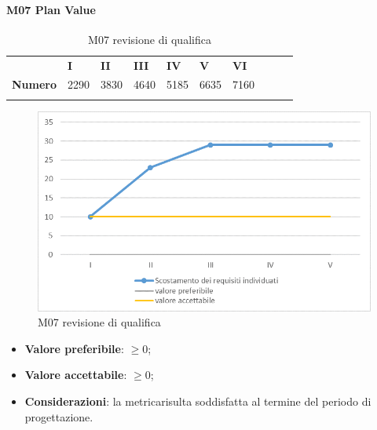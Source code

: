 \paragraph{M07 Plan Value} \mbox{}
\begin{longtable}[H!] {						
		>{}p{50mm}  		
		>{}p{8mm}
		>{}p{8mm}		
		>{}p{8mm}		
		>{}p{8mm}		
		>{}p{8mm}		
		>{}p{8mm}
		>{}p{8mm}
		>{}p{8mm}
		>{}p{8mm}
	}
	\rowcolor{gray!50}
	\textbf{} & \textbf{I} & \textbf{II} & \textbf{III} & \textbf{IV} & \textbf{V} & \textbf{VI} \TBstrut \\ [2mm]
	\textbf{Numero} & 2290 & 3830 & 4640 & 5185 & 6635 & 7160 \TBstrut \\ [2mm]
	\rowcolor{white}
	\caption{M07 revisione di qualifica}
\end{longtable}
\begin{figure}[H] 	
	\includegraphics[width=\linewidth]{./img/grafici/RP1.png}	
	\caption{M07 revisione di qualifica}	
\end{figure}
\begin{itemize}
	\item \textbf{Valore preferibile}: $\ge0$;
	\item \textbf{Valore accettabile}: $\ge0$;
	\item \textbf{Considerazioni}: la metrica\glosp risulta soddisfatta al termine del periodo di progettazione\glo.
\end{itemize}

